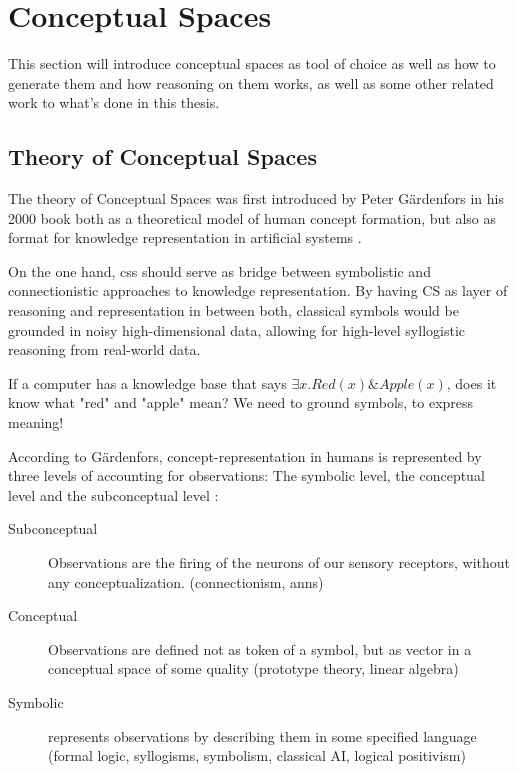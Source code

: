 \section{Conceptual Spaces}

This section will introduce conceptual spaces as tool of choice as well as how to generate them and how reasoning on them works, as well as some other related work to what's done in this thesis.

\subsection*{Theory of Conceptual Spaces}

The theory of Conceptual Spaces was first introduced by Peter Gärdenfors in his 2000 book  \cite{Gardenfors2000a} both as a theoretical model of human concept formation, but also as format for knowledge representation in artificial systems \cite{Gardenfors2004}. 

On the one hand, \glspl{cs} should serve as bridge between symbolistic and connectionistic approaches to knowledge representation. By having CS as layer of reasoning and representation in between both, classical symbols would be grounded in noisy high-dimensional data, allowing for high-level syllogistic reasoning from real-world data. 

If a computer has a knowledge base that says $\exists x.Red(x) \& Apple(x)$, does it know what "red" and "apple" mean? We need to ground symbols, to express meaning!

According to Gärdenfors, concept-representation in humans is represented by three levels of accounting for observations: The symbolic level, the conceptual level and the subconceptual level \cite[204]{Gardenfors2000a}:
\begin{description}
    \item[Subconceptual] Observations are the firing of the neurons of our sensory receptors, without any conceptualization.  (connectionism, \glspl{ann})
    \item[Conceptual] Observations are defined not as token of a symbol, but as vector in a conceptual space of some quality  (prototype theory, linear algebra)
    \item[Symbolic] represents observations by describing them in some specified language (formal logic, syllogisms, symbolism, classical AI, logical positivism)
\end{description}

